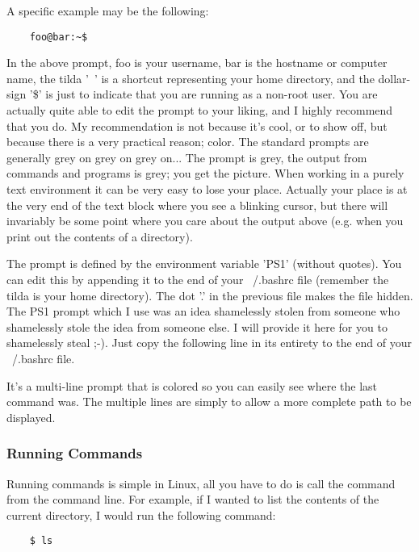 A specific example may be the following:
	
	\begin{verbatim}
	foo@bar:~$
	\end{verbatim}
	
In the above prompt, foo is your username, bar is the hostname or computer name, the tilda '~' is a shortcut representing your home directory, and the dollar-sign '\$' is just to indicate that you are running as a non-root user.  You are actually quite able to edit the prompt to your liking, and I highly recommend that you do.  My recommendation is not because it's cool, or to show off, but because there is a very practical reason; color.  The standard prompts are generally grey on grey on grey on...  The prompt is grey, the output from commands and programs is grey; you get the picture.  When working in a purely text environment it can be very easy to lose your place.  Actually your place is at the very end of the text block where you see a blinking cursor, but there will invariably be some point where you care about the output above (e.g. when you print out the contents of a directory).

The prompt is defined by the environment variable 'PS1' (without quotes).  You can edit this by appending it to the end of your ~/.bashrc file (remember the tilda is your home directory).  The dot '.' in the previous file makes the file hidden.  The PS1 prompt which I use was an idea shamelessly stolen from someone who shamelessly stole the idea from someone else.  I will provide it here for you to shamelessly steal ;-).  Just copy the following line in its entirety to the end of your ~/.bashrc file.

	
It's a multi-line prompt that is colored so you can easily see where the last command was.  The multiple lines are simply to allow a more complete path to be displayed.


\subsubsection{Running Commands} \mdseries 
Running commands is simple in Linux, all you have to do is call the command from the command line.  For example, if I wanted to list the contents of the current directory, I would run the following command:
	\begin{verbatim}
	$ ls
	\end{verbatim}

